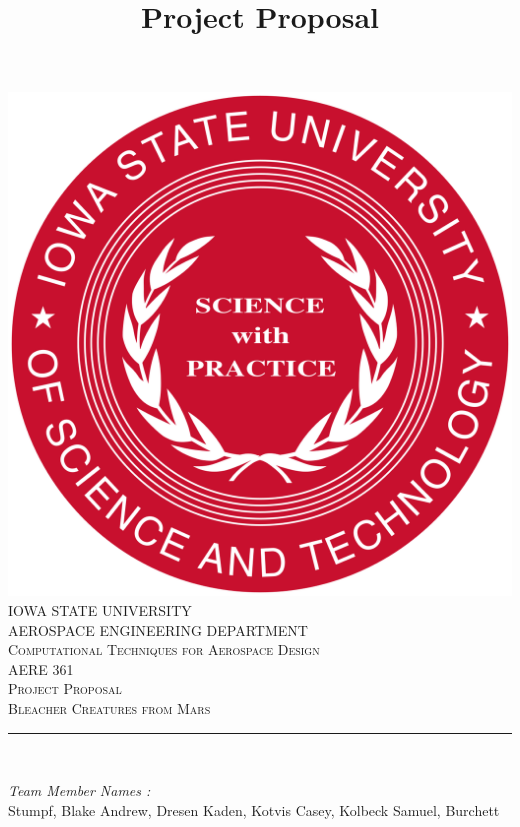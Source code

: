 \documentclass[12pt]{article}
\begin{document}
\title{Project Proposal}

\begin{titlepage}
	\centering
    \vspace*{0.5 cm}
    \includegraphics[scale = 0.11]{isu_seal.png}\\[1.0 cm]	%
    \textsc{\LARGE IOWA STATE UNIVERSITY}\\[2.0 cm]
    \textsc{\large AEROSPACE ENGINEERING DEPARTMENT}\\[0.2 cm]
    \textsc{\large Computational Techniques for Aerospace Design}\\[0.2 cm]
	\textsc{\Large AERE 361}\\[0.5 cm]				%
	\textsc{\Large Project Proposal}\\[0.2 cm]
	\textsc{\Large Bleacher Creatures from Mars}\\[0.2 cm]
	\rule{\linewidth}{0.2 mm} \\[0.4 cm]
	
	
	\begin{minipage}{0.8\textwidth}
		
			\begin{flushleft} 
			\emph{Team Member Names :} \\
			Stumpf, Blake\linebreak
			Andrew, Dresen\linebreak
			Kaden, Kotvis\linebreak
			Casey, Kolbeck\linebreak
			Samuel, Burchett\linebreak
			
		\end{flushleft}
	\end{minipage}\\[2 cm]
	
	\vfill
	
\end{titlepage}
\end{document}
